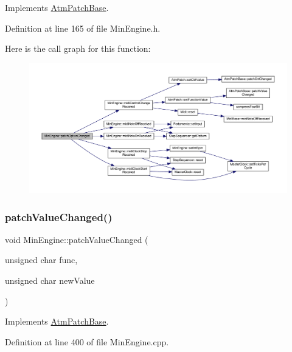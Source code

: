 Implements \hyperlink{class_atm_patch_base_ad31f8d45a0a630ee3052d69ee125e2f3}{Atm\+Patch\+Base}.



Definition at line 165 of file Min\+Engine.\+h.

Here is the call graph for this function\+:
\nopagebreak
\begin{figure}[H]
\begin{center}
\leavevmode
\includegraphics[width=350pt]{d4/d0f/class_min_engine_aff5a85aae7d6f6e5edd571c73c071871_cgraph}
\end{center}
\end{figure}
\mbox{\label{class_min_engine_a229d4b913277a48909bf1aa01176ae1f}} 
\subsubsection{\texorpdfstring{patch\+Value\+Changed()}{patchValueChanged()}}
{\footnotesize\ttfamily void Min\+Engine\+::patch\+Value\+Changed (\begin{DoxyParamCaption}\item[{unsigned char}]{func,  }\item[{unsigned char}]{new\+Value }\end{DoxyParamCaption})\hspace{0.3cm}{\ttfamily [virtual]}}



Implements \hyperlink{class_atm_patch_base_ad561145330e0b53990f222c243ef5e89}{Atm\+Patch\+Base}.



Definition at line 400 of file Min\+Engine.\+cpp.

